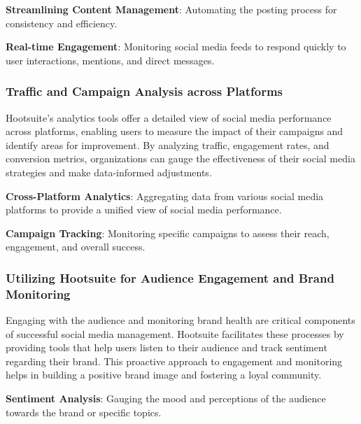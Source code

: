 \documentclass[
]{book}
\begin{document}
\textbf{Streamlining Content Management}: Automating the posting process for consistency and efficiency.

\textbf{Real-time Engagement}: Monitoring social media feeds to respond quickly to user interactions, mentions, and direct messages.

\hypertarget{traffic-and-campaign-analysis-across-platforms}{%
\subsubsection*{Traffic and Campaign Analysis across Platforms}\label{traffic-and-campaign-analysis-across-platforms}}

Hootsuite's analytics tools offer a detailed view of social media performance across platforms, enabling users to measure the impact of their campaigns and identify areas for improvement. By analyzing traffic, engagement rates, and conversion metrics, organizations can gauge the effectiveness of their social media strategies and make data-informed adjustments.

\textbf{Cross-Platform Analytics}: Aggregating data from various social media platforms to provide a unified view of social media performance.

\textbf{Campaign Tracking}: Monitoring specific campaigns to assess their reach, engagement, and overall success.

\hypertarget{utilizing-hootsuite-for-audience-engagement-and-brand-monitoring}{%
\subsubsection*{Utilizing Hootsuite for Audience Engagement and Brand Monitoring}\label{utilizing-hootsuite-for-audience-engagement-and-brand-monitoring}}

Engaging with the audience and monitoring brand health are critical components of successful social media management. Hootsuite facilitates these processes by providing tools that help users listen to their audience and track sentiment regarding their brand. This proactive approach to engagement and monitoring helps in building a positive brand image and fostering a loyal community.

\textbf{Sentiment Analysis}: Gauging the mood and perceptions of the audience towards the brand or specific topics.
\end{document}
